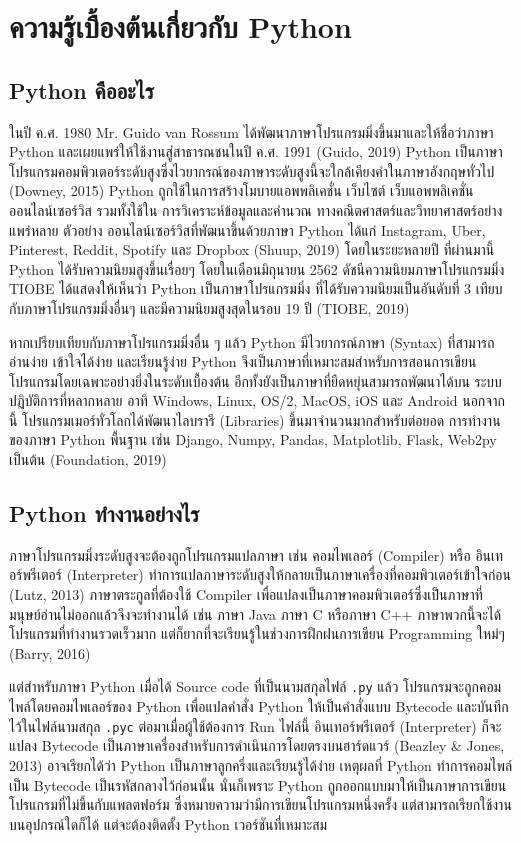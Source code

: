 \chapter{ความรู้เบื้องต้นเกี่ยวกับ Python}

\section{Python คืออะไร}

ในปี ค.ศ. 1980 Mr. Guido van Rossum ได้พัฒนาภาษาโปรแกรมมิ่งขึ้นมาและให้ชื่อว่าภาษา Python และเผยแพร่ให้ใช้งานสู่สาธารณชนในปี ค.ศ. 1991 (Guido, 2019) Python เป็นภาษาโปรแกรมคอมพิวเตอร์ระดับสูงซึ่งไวยากรณ์ของภาษาระดับสูงนี้จะใกล้เคียงคำในภาษาอังกฤษทั่วไป (Downey, 2015) Python ถูกใช้ในการสร้างโมบายแอพพลิเคชั่น เว็บไซต์ เว็บแอพพลิเคชั่น ออนไลน์เซอร์วิส รวมทั้งใช้ใน การวิเคราะห์ข้อมูลและคำนวณ ทางคณิตศาสตร์และวิทยาศาสตร์อย่างแพร่หลาย  ตัวอย่าง ออนไลน์เซอร์วิสที่พัฒนาขึ้นด้วยภาษา Python ได้แก่ Instagram, Uber, Pinterest, Reddit, Spotify และ Dropbox (Shuup, 2019) โดยในระยะหลายปี ที่ผ่านมานี้ Python ได้รับความนิยมสูงขึ้นเรื่อยๆ โดยในเดือนมิถุนายน 2562 ดัชนีความนิยมภาษาโปรแกรมมิ่ง TIOBE ได้แสดงให้เห็นว่า Python เป็นภาษาโปรแกรมมิ่ง ที่ได้รับความนิยมเป็นอันดับที่ 3 เทียบกับภาษาโปรแกรมมิ่งอื่นๆ และมีความนิยมสูงสุดในรอบ 19 ปี (TIOBE, 2019)

หากเปรียบเทียบกับภาษาโปรแกรมมิ่งอื่น ๆ แล้ว Python มีไวยากรณ์ภาษา (Syntax) ที่สามารถอ่านง่าย เข้าใจได้ง่าย และเรียนรู้ง่าย Python จึงเป็นภาษาที่เหมาะสมสำหรับการสอนการเขียนโปรแกรมโดยเฉพาะอย่างยิ่งในระดับเบื้องต้น อีกทั้งยังเป็นภาษาที่ยืดหยุ่นสามารถพัฒนาได้บน ระบบปฏิบัติการที่หลากหลาย อาทิ  Windows, Linux, OS/2, MacOS, iOS และ Android นอกจากนี้ โปรแกรมเมอร์ทั่วโลกได้พัฒนาไลบรารี (Libraries) ขึ้นมาจำนวนมากสำหรับต่อยอด การทำงานของภาษา Python พื้นฐาน เช่น Django, Numpy, Pandas, Matplotlib, Flask, Web2py เป็นต้น (Foundation, 2019)

\section{Python ทำงานอย่างไร}

ภาษาโปรแกรมมิ่งระดับสูงจะต้องถูกโปรแกรมแปลภาษา เช่น คอมไพเลอร์ (Compiler) หรือ อินเทอร์พรีเตอร์ (Interpreter) ทำการแปลภาษาระดับสูงให้กลายเป็นภาษาเครื่องที่คอมพิวเตอร์เข้าใจก่อน (Lutz, 2013) ภาษาตระกูลที่ต้องใช้ Compiler เพื่อแปลงเป็นภาษาคอมพิวเตอร์ซึ่งเป็นภาษาที่มนุษย์อ่านไม่ออกแล้วจึงจะทำงานได้ เช่น ภาษา Java ภาษา C หรือภาษา C++ ภาษาพวกนี้จะได้โปรแกรมที่ทำงานรวดเร็วมาก แต่ก็ยากที่จะเรียนรู้ในช่วงการฝึกฝนการเขียน Programming ใหม่ๆ (Barry, 2016)

แต่สำหรับภาษา Python เมื่อได้ Source code ที่เป็นนามสกุลไฟล์ \texttt{.py} แล้ว โปรแกรมจะถูกคอมไพล์โดยคอมไพเลอร์ของ Python เพื่อแปลคำสั่ง Python ให้เป็นคำสั่งแบบ Bytecode และบันทึกไว้ในไฟล์นามสกุล \texttt{.pyc} ต่อมาเมื่อผู้ใช้ต้องการ Run ไฟล์นี้ อินเทอร์พรีเตอร์ (Interpreter) ก็จะแปลง Bytecode เป็นภาษาเครื่องสำหรับการดำเนินการโดยตรงบนฮาร์ดแวร์ (Beazley \& Jones, 2013) อาจเรียกได้ว่า Python เป็นภาษาลูกครึ่งและเรียนรู้ได้ง่าย เหตุผลที่ Python ทำการคอมไพล์เป็น Bytecode เป็นรหัสกลางไว้ก่อนนั้น นั่นก็เพราะ Python ถูกออกแบบมาให้เป็นภาษาการเขียนโปรแกรมที่ไม่ขึ้นกับแพลตฟอร์ม ซึ่งหมายความว่ามีการเขียนโปรแกรมหนึ่งครั้ง แต่สามารถเรียกใช้งานบนอุปกรณ์ใดก็ได้ แต่จะต้องติดตั้ง Python เวอร์ชันที่เหมาะสม 